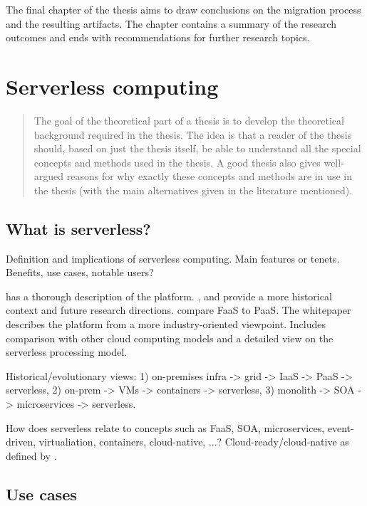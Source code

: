 \documentclass[utf8,english]{gradu3}
\begin{document}
The final chapter of the thesis aims to draw conclusions on the migration process and the resulting artifacts. The chapter contains a summary of the research outcomes and ends with recommendations for further research topics.

\chapter{Serverless computing}

\begin{quote}
The goal of the theoretical part of a thesis is to develop the theoretical background required in the thesis.  The idea is that a reader of the thesis should, based on just the thesis itself, be able to understand all the special concepts and methods used in the thesis. A good thesis also gives well-argued reasons for why exactly these concepts and methods are in use in the thesis (with the main alternatives given in the literature mentioned).
\end{quote}

\section{What is serverless?}

Definition and implications of serverless computing. Main features or tenets. Benefits, use cases, notable users?

\textcite{robert2016serverlessarchitectures} has a thorough description of the platform.  \textcite{van2017spec}, \textcite{varghese18next} and \textcite{buyya2017manifesto} provide a more historical context and future research directions. \textcite{albuquerque17faaspaas} compare FaaS to PaaS. The \textcite{cncf18serverlessWG} whitepaper describes the platform from a more industry-oriented viewpoint. Includes comparison with other cloud computing models and a detailed view on the serverless processing model.

Historical/evolutionary views: 1) on-premises infra -> grid -> IaaS -> PaaS -> serverless, 2) on-prem -> VMs -> containers -> serverless, 3) monolith -> SOA -> microservices -> serverless.

How does serverless relate to concepts such as FaaS, SOA, microservices, event-driven, virtualiation, containers, cloud-native, ...? Cloud-ready/cloud-native as defined by \textcite{pozdniakova17cloudready}.

\section{Use cases}
\end{document}
